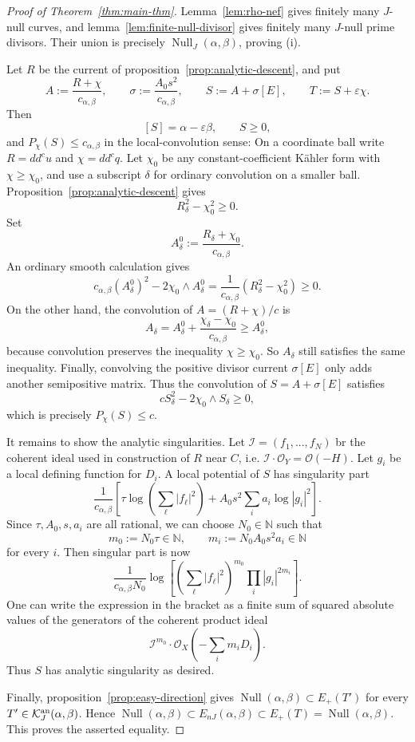 \documentclass[reqno]{amsart}
\theoremstyle{remark}
\def\N{\mathbb{N}}
\newcommand{\ddc}{dd^c}
\newcommand{\JNull}{\operatorname{Null}_{J}}
\newcommand{\JEnK}{E_{nJ}}
\newcommand{\cab}{c_{\alpha,\beta}}
\newcommand{\Null}{\operatorname{Null}}
\def\cI{{\mathcal I}}
\def\cK{{\mathcal K}}
\def\cO{{\mathcal O}}
\theoremstyle{plain}
\begin{document}
\begin{proof}[Proof of Theorem~\ref{thm:main-thm}]
Lemma~\ref{lem:rho-nef} gives finitely many $J$-null curves, and
lemma~\ref{lem:finite-null-divisor} gives  finitely many $J$-null prime divisors.
Their union is precisely $\JNull(\alpha,\beta)$, proving (i).

Let $R$ be the current
of proposition~\ref{prop:analytic-descent}, and put
\[
 A:=\frac{R+\chi}{\cab},\qquad
 \sigma:=\frac{A_0s^2}{\cab},\qquad
 S:=A+\sigma[E],\qquad
 T:=S+\varepsilon\chi.
\]
Then
\[
 [S]=\alpha-\varepsilon\beta,\qquad S\geq0,
\]
and $P_\chi(S)\leq \cab$ in the local-convolution sense:   On a coordinate ball write $R=\ddc u$ and
$\chi=\ddc q$.  Let $\chi_0$ be any constant-coefficient K\"ahler
form with $\chi\geq\chi_0$, and use a subscript $\delta$ for
ordinary convolution on a smaller ball.  Proposition~\ref{prop:analytic-descent}
gives
\[
 R_\delta^2-\chi_0^2\geq0.
\]
Set
\[
 A_\delta^0:=\frac{R_\delta+\chi_0}{\cab}.
\]
An ordinary smooth calculation gives
\[
 \cab(A_\delta^0)^2-2\chi_0\wedge A_\delta^0
 =\frac{1}{\cab}(R_\delta^2-\chi_0^2)\geq0.
\]
On the other hand, the convolution of $A=(R+\chi)/c$ is
\[
 A_\delta=A_\delta^0+\frac{\chi_\delta-\chi_0}{\cab}
 \geq A_\delta^0,
\]
because convolution preserves the inequality $\chi\geq\chi_0$.
So $A_\delta$ still
satisfies the same inequality.  Finally, convolving the positive
divisor current $\sigma[E]$ only adds another semipositive matrix.
Thus the convolution of $S=A+\sigma[E]$ satisfies
\[
 cS_\delta^2-2\chi_0\wedge S_\delta\geq0,
\]
which is precisely $P_\chi(S)\leq c$.

It remains to show the analytic singularities. Let $\cI=(f_1,...,f_N)$ br the coherent ideal used in construction of $R$ near $C$, i.e. $\cI\cdot \cO_Y=\cO(-H)$.  Let $g_i$ be a local defining function for $D_i$. A local potential of $S$ has singularity part \[
\frac{1}{\cab}\left[\tau\log\left(\sum_{\ell}|f_\ell|^2\right)+A_0s^2\sum_ia_i\log|g_i|^2 \right].
\]
Since $\tau, A_0, s, a_i$ are all rational, we can choose $N_0\in \N$ such that \[
m_0:=N_0\tau\in \N,\qquad m_i:=N_0A_0s^2a_i\in \N
\]for every $i$. Then singular part is now \[
\frac{1}{\cab N_0}\log\left[\left(\sum_\ell|f_\ell|^2\right)^{m_0}\prod_{i}|g_i|^{2m_i}\right].
\]
One can write the expression in the bracket as a finite sum of squared absolute values of the generators of the coherent product ideal \[
\cI^{m_0}\cdot\cO_X\left(-\sum_im_iD_i\right).
\]Thus $S$ has analytic singularity as desired. 

Finally, proposition~\ref{prop:easy-direction} gives $\Null(\alpha,\beta)\subset E_+(T')$ for every $T'\in \cK_{J}^{\rm an}(\alpha,\beta)$. Hence $\Null(\alpha,\beta)\subset \JEnK(\alpha,\beta)\subset E_+(T)=\Null(\alpha,\beta)$. This proves the asserted equality. 
\end{proof}
\end{document}
